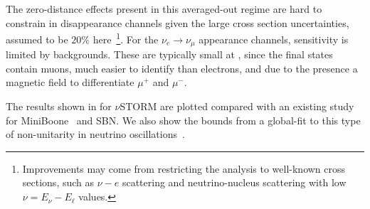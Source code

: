 The zero-distance effects present in this averaged-out regime are hard to constrain in disappearance channels given the large cross section uncertainties, assumed to be $20\%$ here~\footnote{Improvements may come from restricting the analysis to well-known cross sections, such as $\nu-e$ scattering and neutrino-nucleus scattering with low $\nu = E_\nu - E_\ell$ values.}. For the $\nu_e\to\nu_\mu$ appearance channels, sensitivity is limited by backgrounds. These are typically small at \nus, since the final states contain muons, much easier to identify than electrons, and due to the presence a magnetic field to differentiate $\mu^+$ and $\mu^-$.

The results shown in  for $\nu$STORM are plotted compared with an existing study for MiniBoone~\cite{Karagiorgi2010} and SBN. We also show the bounds from  a global-fit to this type of non-unitarity in neutrino oscillations~\cite{Ross-Lonergan2016}.
%
